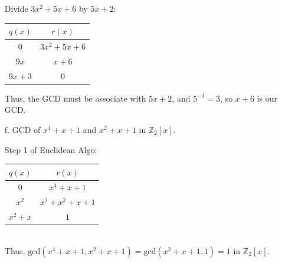 \documentclass[12pt]{article}
\begin{document}
\begin{enumerate}
{    Divide $3x^2 + 5x + 6$ by $5x + 2$:
    
    {\centering \noindent \begin{tabular}{|c|c|}
        \hline $q(x)$ & $r(x)$ \\\hline
        0 & $3x^2 + 5x + 6$ \\ \hline
        $9x$ & $x + 6$ \\ \hline
        $9x + 3$ & 0 \\ \hline
    \end{tabular} \par}

    Thus, the GCD must be associate with $5x + 2$, and $5^{-1} = 3$, so $x + 6$ is our GCD.
}
\item[f.] GCD of $x^4+x+1$ and $x^2 + x + 1$ in $\mathbb Z_2[x]$. {
    Step 1 of Euclidean Algo: \\
    \begin{tabular}{|c|c|}
        \hline
        $q(x)$ & $r(x)$ \\ \hline
        0 & $x^4 + x + 1$ \\ \hline
        $x^2$ & $x^3 + x^2 + x + 1$ \\ \hline
        $x^2 + x$ & $1$ \\ \hline
    \end{tabular} \\
    Thus, $\mathrm{gcd}(x^4+x+1, x^2+x+1) = \mathrm{gcd}(x^2 + x + 1, 1) = 1$ in $\mathbb Z_2[x]$.
}
\end{enumerate}
\end{document}
